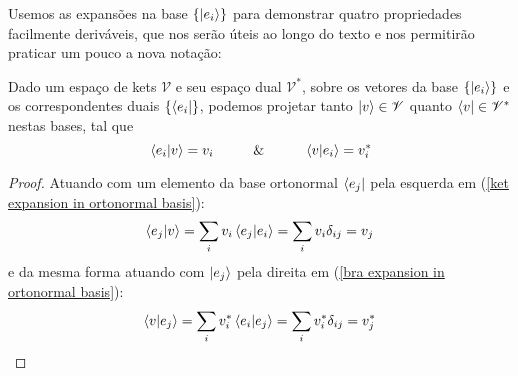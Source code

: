     Usemos as expansões na base $\{\ket{e_i}\}$ para demonstrar quatro propriedades facilmente deriváveis, que nos serão úteis ao longo do texto e nos permitirão praticar um pouco a nova notação:
    \begin{properties}
        \label{proper: projection under base vector}
        Dado um  espaço de kets $\mathscr{V}$ e seu espaço dual $\mathscr{V}^{\ast}$, sobre os vetores da base $\{\ket{e_{i}}\}$ e os correspondentes duais $\{\bra{e_{i}}\}$, podemos projetar tanto $\ket{v}\in\mathscr{V}$ quanto $\bra{v}\in\mathscr{V}^{\ast}$ nestas bases, tal que 
            \begin{equation*}
                \braket*{e_{i}}{v} = v_{i} \hspace{1cm} \& \hspace{1cm} \braket{v}{e_{i}} = v_{i}^{\ast}
            \end{equation*}
    \end{properties}
    \begin{proof}
        Atuando com um elemento da base ortonormal $\bra{e_j}$ pela esquerda em (\ref{ket expansion in ortonormal basis}):
        \begin{equation*}
            \braket{e_j}{v} = \sum_i v_i \braket{e_j}{e_i} = \sum_i v_i \delta_{ij} = v_j
        \end{equation*}
        e da mesma forma atuando com $\ket{e_j}$ pela direita em (\ref{bra expansion in ortonormal basis}):
        \begin{equation*}
            \braket{v}{e_j} = \sum_i v_i^*\braket{e_{i}}{e_j} = \sum_i v_i^* \delta_{ij} = v_j^*
        \end{equation*}
    \end{proof}

